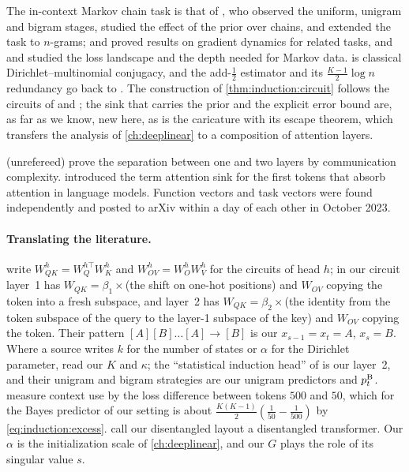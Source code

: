 \begin{refsection}
The in-context Markov chain task is that of \textcite{EdelmanEtAl2024}, who observed the uniform, unigram and bigram stages, studied the effect of the prior over chains, and extended the task to $n$-grams; \textcite{NichaniEtAl2024} and \textcite{BiettiEtAl2023} proved results on gradient dynamics for related tasks, and \textcite{MakkuvaEtAl2025} and \textcite{RajaramanEtAl2024} studied the loss landscape and the depth needed for Markov data.  is classical Dirichlet--multinomial conjugacy, and the add-$\frac12$ estimator and its $\frac{K-1}2\log n$ redundancy go back to \textcite{KrichevskyTrofimov1981}. The construction of \cref{thm:induction:circuit} follows the circuits of \textcite{ElhageEtAl2021} and \textcite{EdelmanEtAl2024}; the sink that carries the prior and the explicit error bound are, as far as we know, new here, as is the caricature with its escape theorem, which transfers the analysis of \cref{ch:deeplinear} to a composition of attention layers.

\Textcite{SanfordEtAl2024} (unrefereed) prove the separation between one and two layers by communication complexity. \Textcite{XiaoEtAl2024} introduced the term attention sink for the first tokens that absorb attention in language models. Function vectors and task vectors \parencite{ToddEtAl2024,HendelEtAl2023} were found independently and posted to arXiv within a day of each other in October 2023.

\paragraph{Translating the literature.} \Textcite{ElhageEtAl2021} write $W_{QK}^h=W_Q^{h\top}W_K^h$ and $W_{OV}^h=W_O^hW_V^h$ for the circuits of head $h$; in our circuit layer~1 has $W_{QK}=\beta_1\times$(the shift on one-hot positions) and $W_{OV}$ copying the token into a fresh subspace, and layer~2 has $W_{QK}=\beta_2\times$(the identity from the token subspace of the query to the layer-1 subspace of the key) and $W_{OV}$ copying the token. Their pattern $[A][B]\dots[A]\to[B]$ is our $x_{s-1}=x_t=A$, $x_s=B$. Where a source writes $k$ for the number of states or $\alpha$ for the Dirichlet parameter, read our $K$ and $\kappa$; the ``statistical induction head'' of \textcite{EdelmanEtAl2024} is our layer~2, and their unigram and bigram strategies are our unigram predictors and $p^{\mathrm{B}}_t$. \Textcite{OlssonEtAl2022} measure context use by the loss difference between tokens $500$ and $50$, which for the Bayes predictor of our setting is about $\frac{K(K-1)}2(\frac1{50}-\frac1{500})$ by \eqref{eq:induction:excess}. \Textcite{NichaniEtAl2024} call our disentangled layout a disentangled transformer. Our $\alpha$ is the initialization scale of \cref{ch:deeplinear}, and our $G$ plays the role of its singular value $s$.

\printchapterbib
\end{refsection}
